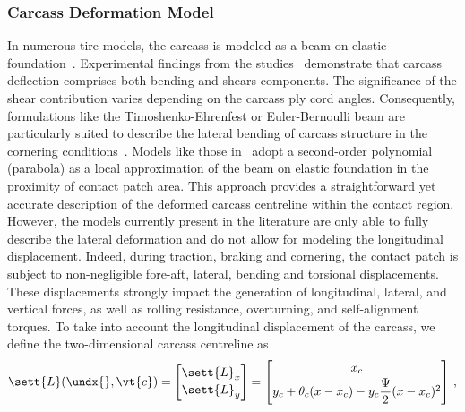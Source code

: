 
\subsubsection{Carcass Deformation Model}
\label{app3:sec:carcass_model}

In numerous tire models, the carcass is modeled as a beam on elastic foundation~\cite{dehoogh2005implementing, sarkisov2019physical, gil2020inplane, nakajima2019advanced}. Experimental findings from the studies~\cite{sarkisov2019physical, gil2020inplane} demonstrate that carcass deflection comprises both bending and shears components. The significance of the shear contribution varies depending on the carcass ply cord angles. Consequently, formulations like the Timoshenko-Ehrenfest or Euler-Bernoulli beam are particularly suited to describe the lateral bending of carcass structure in the cornering conditions~\cite{gil2020inplane}. Models like those in~\cite{fiala1954seitenkraften, miyashita2006new, kabe2006new, xu2014analytical, gil2020inplane, sakai1981theoreticalI, sakai1981theoreticalII, sakai1981theoreticalIII, sakai1982theoreticalIV, miyashita2010tire, fevrier2013method} adopt a second-order polynomial (parabola) as a local approximation of the beam on elastic foundation in the proximity of contact patch area. This approach provides a straightforward yet accurate description of the deformed carcass centreline within the contact region. However, the models currently present in the literature are only able to fully describe the lateral deformation and do not allow for modeling the longitudinal displacement. Indeed, during traction, braking and cornering, the contact patch is subject to non-negligible fore-aft, lateral, bending and torsional displacements. These displacements strongly impact the generation of longitudinal, lateral, and vertical forces, as well as rolling resistance, overturning, and self-alignment torques. To take into account the longitudinal displacement of the carcass, we define the two-dimensional carcass centreline as
%
\begin{equation}
  \sett{L}(\undx{}, \vt{c}) =
  \begin{bmatrix}
    \sett{L}_x \\[0.2em]
    \sett{L}_y
  \end{bmatrix} =
  \begin{bmatrix}
    x_c \\[0.2em]
    y_c + \theta_c(x-x_c) - y_c\dfrac{\Psi}{2}(x-x_c)^2
  \end{bmatrix} \, \text{,}
  \label{app3:eq:parabola}
\end{equation}
